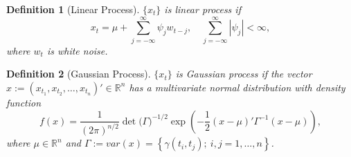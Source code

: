 \documentclass[10pt,titlepage,oneside,openany]{report}
\theoremstyle{remark}
\theoremstyle{plain}
\newtheorem{Definition}{Definition}[section]
\newcommand{\R}{\mathbb{R}}
\numberwithin{equation}{section}
\begin{document}
\begin{Definition}[Linear Process]
	$\{x_t\}$ is linear process if 
	\[
	x_t = \mu + \sum_{j=-\infty}^\infty \psi_j w_{t-j}, \quad \sum_{j=-\infty}^\infty |\psi_j|< \infty,
	\]
	where $w_t$ is white noise.
\end{Definition}

\begin{Definition}[Gaussian Process]
	$\{x_t\}$ is Gaussian process if the vector $x := (x_{t_1}, x_{t_2},\dots, x_{t_n})' \in \R^n$ has a multivariate normal distribution with density function
	\[
	f(x) = \frac{1}{(2\pi)^{n/2}} \det\big(\Gamma\big)^{-1/2} \exp \left(-\frac{1}{2} (x-\mu)' \Gamma^{-1} (x-\mu) \right),
	\]
	where $\mu \in \R^n$ and $\Gamma:= var (x) = \left\{ \gamma(t_i, t_j);\ i,j=1,\dots,n\right\}$.
\end{Definition}


\clearpage
%
%
\end{document}
